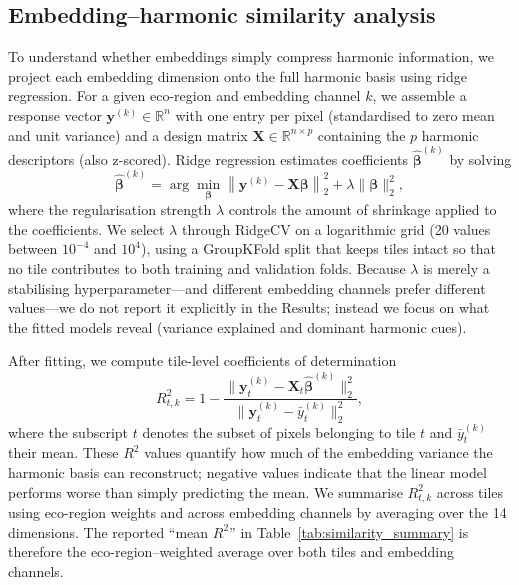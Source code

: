 \documentclass[utf8]{FrontiersinHarvard}
\begin{document}
\subsection{Embedding–harmonic similarity analysis}
To understand whether embeddings simply compress harmonic information, we project each embedding dimension onto the full harmonic basis using ridge regression. For a given eco-region and embedding channel \(k\), we assemble a response vector \(\mathbf{y}^{(k)} \in \mathbb{R}^n\) with one entry per pixel (standardised to zero mean and unit variance) and a design matrix \(\mathbf{X} \in \mathbb{R}^{n \times p}\) containing the \(p\) harmonic descriptors (also z-scored). Ridge regression estimates coefficients \(\hat{\boldsymbol{\beta}}^{(k)}\) by solving
\begin{equation*}
    \hat{\boldsymbol{\beta}}^{(k)} = \arg\min_{\boldsymbol{\beta}} \left\| \mathbf{y}^{(k)} - \mathbf{X}\boldsymbol{\beta} \right\|_2^2 + \lambda \|\boldsymbol{\beta}\|_2^2,
\end{equation*}
where the regularisation strength \(\lambda\) controls the amount of shrinkage applied to the coefficients. We select \(\lambda\) through RidgeCV on a logarithmic grid (20 values between \(10^{-4}\) and \(10^{4}\)), using a GroupKFold split that keeps tiles intact so that no tile contributes to both training and validation folds. Because \(\lambda\) is merely a stabilising hyperparameter—and different embedding channels prefer different values—we do not report it explicitly in the Results; instead we focus on what the fitted models reveal (variance explained and dominant harmonic cues).

After fitting, we compute tile-level coefficients of determination
\begin{equation*}
    R^2_{t,k} = 1 - \frac{\|\mathbf{y}^{(k)}_t - \mathbf{X}_t \hat{\boldsymbol{\beta}}^{(k)}\|_2^2}{\|\mathbf{y}^{(k)}_t - \bar{y}^{(k)}_t\|_2^2},
\end{equation*}
where the subscript \(t\) denotes the subset of pixels belonging to tile \(t\) and \(\bar{y}^{(k)}_t\) their mean. These $R^2$ values quantify how much of the embedding variance the harmonic basis can reconstruct; negative values indicate that the linear model performs worse than simply predicting the mean. We summarise \(R^2_{t,k}\) across tiles using eco-region weights and across embedding channels by averaging over the 14 dimensions. The reported “mean $R^2$” in Table~\ref{tab:similarity_summary} is therefore the eco-region–weighted average over both tiles and embedding channels.
\end{document}
